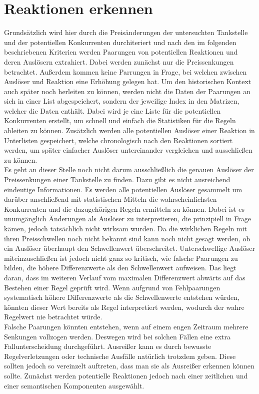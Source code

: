 \section{Reaktionen erkennen}
Grundsätzlich wird hier durch die Preisänderungen der untersuchten Tankstelle und der potentiellen Konkurrenten durchiteriert und nach den im folgenden beschriebenen Kriterien werden Paarungen von potentiellen Reaktionen und deren Auslösern extrahiert. Dabei werden zunächst nur die Preissenkungen betrachtet. Außerdem kommen keine Parrungen in Frage, bei welchen zwischen Auslöser und Reaktion eine Erhöhung gelegen hat. Um den historischen Kontext auch später noch herleiten zu können, werden nicht die Daten der Paarungen an sich in einer List abgespeichert, sondern der jeweilige Index in den Matrizen, welcher die Daten enthält. Dabei wird je eine Liste für die potentiellen Konkurrenten erstellt, um schnell und einfach die Statistiken für die Regeln ableiten zu können. Zusätzlich werden alle potentiellen Auslöser einer Reaktion in Unterlisten gespeichert, welche chronologisch nach den Reaktionen sortiert werden, um später einfacher Auslöser untereinander vergleichen und ausschließen zu können.\\
Es geht an dieser Stelle noch nicht darum ausschließlich die genauen Auslöser der Preissenkungen einer Tankstelle zu finden. Dazu gibt es nicht ausreichend eindeutige Informationen. Es werden alle potentiellen Auslöser gesammelt um darüber anschließend mit statistischen Mitteln die wahrscheinlichsten Konkurrenten und die dazugehörigen Regeln ermitteln zu können. Dabei ist es unumgänglich  Änderungen als Auslöser zu interpretieren, die prinzipiell in Frage kämen, jedoch tatsächlich nicht wirksam wurden. Da die wirklichen Regeln mit ihren Preisschwellen noch nicht bekannt sind kann noch nicht gesagt werden, ob ein Auslöser überhaupt den Schwellenwert überschreitet. Unterschwellige Auslöser miteinzuschließen ist jedoch nicht ganz so kritisch, wie falsche Paarungen zu bilden, die höhere Differenzwerte als den Schwellenwert aufweisen. Das liegt daran, dass im weiteren Verlauf vom maximalen Differenzwert abwärts auf das Bestehen einer Regel geprüft wird. Wenn aufgrund von Fehlpaarungen systematisch höhere Differenzwerte als die Schwellenwerte entstehen würden, könnten dieser Wert bereits als Regel interpretiert werden, wodurch der wahre Regelwert nie betrachtet würde.\\
Falsche Paarungen könnten entstehen, wenn auf einem engen Zeitraum mehrere Senkungen vollzogen werden. Deswegen wird bei solchen Fällen eine extra Fallunterscheidung durchgeführt. Ausreißer kann es durch bewusste Regelverletzungen oder technische Ausfälle natürlich trotzdem geben. Diese sollten jedoch so vereinzelt auftreten, dass man sie als Ausreißer erkennen können sollte. Zunächst werden potentielle Reaktionen jedoch nach einer zeitlichen und einer semantischen Komponenten ausgewählt.

